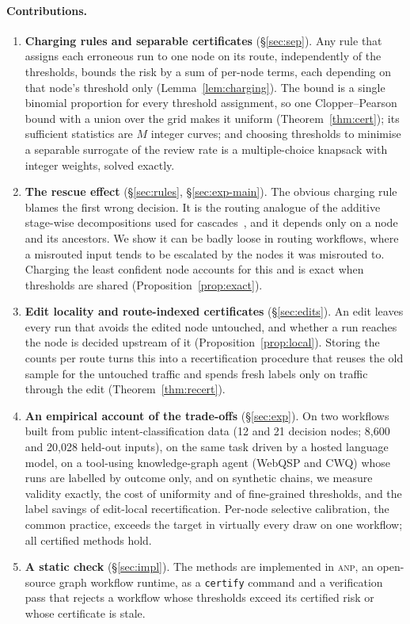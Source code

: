 \documentclass[11pt]{article}
\theoremstyle{definition}
\theoremstyle{remark}
\newcommand{\anp}{\textsc{anp}}
\begin{document}
\paragraph{Contributions.}
\begin{enumerate}[leftmargin=1.5em,itemsep=2pt,topsep=3pt]
\item \textbf{Charging rules and separable certificates} (\S\ref{sec:sep}). Any rule that
assigns each erroneous run to one node on its route, independently of the thresholds, bounds
the risk by a sum of per-node terms, each depending on that node's threshold only
(Lemma~\ref{lem:charging}). The bound is a single binomial proportion for every threshold
assignment, so one Clopper--Pearson bound with a union over the grid makes it uniform
(Theorem~\ref{thm:cert}); its sufficient statistics are $M$ integer curves; and choosing
thresholds to minimise a separable surrogate of the review rate is a multiple-choice knapsack
with integer weights, solved exactly.
\item \textbf{The rescue effect} (\S\ref{sec:rules}, \S\ref{sec:exp-main}). The obvious charging
rule blames the first wrong decision. It is the routing analogue of the additive stage-wise
decompositions used for cascades~\citep{sun2026compcrc}, and it depends only on a node and
its ancestors. We show it can be badly loose in routing workflows, where a misrouted input
tends to be escalated by the nodes it was misrouted to. Charging the least confident node
accounts for this and is exact when thresholds are shared (Proposition~\ref{prop:exact}).
\item \textbf{Edit locality and route-indexed certificates} (\S\ref{sec:edits}). An edit leaves
every run that avoids the edited node untouched, and whether a run reaches the node is decided
upstream of it (Proposition~\ref{prop:local}). Storing the counts per route turns this into a
recertification procedure that reuses the old sample for the untouched traffic and spends
fresh labels only on traffic through the edit (Theorem~\ref{thm:recert}).
\item \textbf{An empirical account of the trade-offs} (\S\ref{sec:exp}). On two workflows built
from public intent-classification data (12 and 21 decision nodes; 8{,}600 and 20{,}028
held-out inputs), on the same task driven by a hosted language model, on a tool-using
knowledge-graph agent (WebQSP and CWQ) whose runs are labelled by outcome only, and on
synthetic chains, we measure validity exactly, the cost of uniformity and of fine-grained thresholds,
and the label savings of edit-local recertification. Per-node selective calibration, the
common practice, exceeds the target in virtually every draw on one workflow; all certified
methods hold.
\item \textbf{A static check} (\S\ref{sec:impl}). The methods are implemented in \anp, an
open-source graph workflow runtime, as a \texttt{certify} command and a verification pass that
rejects a workflow whose thresholds exceed its certified risk or whose certificate is stale.
\end{enumerate}
\end{document}
